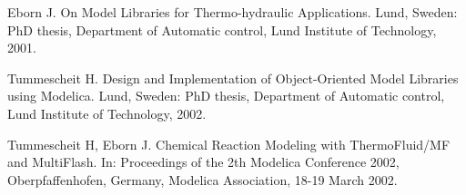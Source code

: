 \begin{thebibliography}{00}

 Eborn J. On Model Libraries for Thermo-hydraulic
Applications. Lund, Sweden: PhD thesis, Department of Automatic
control, Lund Institute of Technology, 2001.

Tummescheit H. Design and Implementation of Object-Oriented Model Libraries
using Modelica. Lund, Sweden: PhD thesis, Department of Automatic
control, Lund Institute of Technology, 2002.

 Tummescheit H, Eborn J. Chemical Reaction
Modeling with ThermoFluid/MF and MultiFlash. In: Proceedings of the 2th
Modelica Conference 2002, Oberpfaffenhofen, Germany, Modelica
Association, 18-19 March 2002.
\end{thebibliography}
